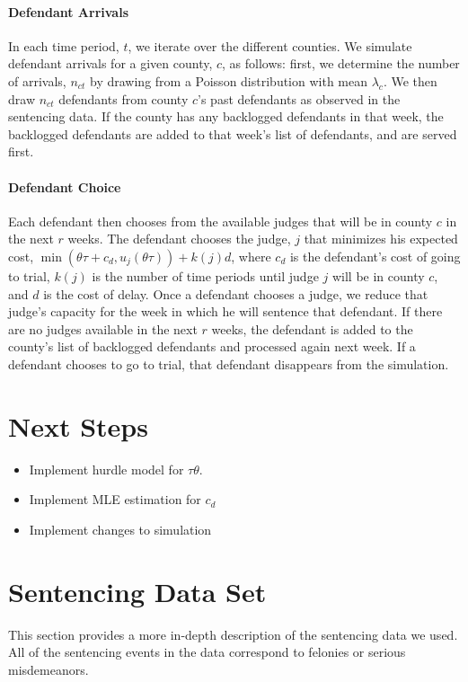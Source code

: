 \documentclass[11pt]{article}
\theoremstyle{ModifiedStyle}
\begin{document}
  \paragraph{Defendant Arrivals} In each time period, $t$, we iterate over the different counties. We simulate defendant arrivals for a given county, $c$, as follows: first, we determine the number of arrivals, $n_{ct}$ by drawing from a Poisson distribution with mean $\lambda_c$. We then draw $n_{ct}$ defendants from county $c$'s past defendants as observed in the sentencing data. If the county has any backlogged defendants in that week, the backlogged defendants are added to that week's list of defendants, and are served first.

  \paragraph{Defendant Choice} Each defendant then chooses from the available judges that will be in
  county $c$ in the next $r$ weeks. The defendant chooses the judge, $j$ that minimizes his expected cost, $\min(\theta \tau + c_d,u_j(\theta \tau)) + k(j)d$, where $c_d$ is the defendant's cost of going to trial, $k(j)$ is the number of time periods until judge $j$ will be in county $c$, and $d$ is the cost of delay. Once a defendant chooses a judge, we reduce that judge's capacity for the week in which he will sentence that defendant. If there are no judges available in the next $r$ weeks, the defendant is added to the county's list of backlogged defendants and processed again next week. If a defendant chooses to go to trial, that defendant disappears from the simulation.

\section{Next Steps}
  \begin{itemize}
    \item Implement hurdle model for $\tau \theta$.
    \item Implement MLE estimation for $c_d$
    \item Implement changes to simulation
  \end{itemize}

 \printbibliography

\appendix
\section{Sentencing Data Set}
  \label{Sec:Sentencing_Data_Description}
  This section provides a more in-depth description of the sentencing data we used. All of the sentencing events in the data correspond to felonies or serious misdemeanors.
\end{document}
